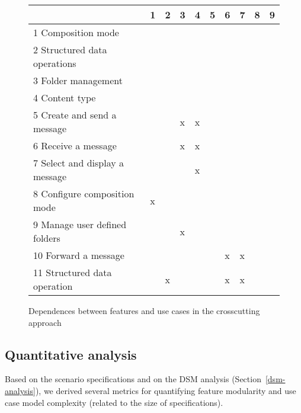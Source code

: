 \documentclass{acm_proc_article-sp}
\begin{document}
\begin{figure}[h]
\centering
\begin{scriptsize}
\begin{tabular}{llllllllll} \hline
								& 1 	& 2 	& 3 & 4 	& 5 	& 6 	& 7 	& 8 	& 9 	 \\ \hline
1 Composition mode 				& 	& 	& 	& 	& 	& 	& 	& 	& 		\\
2 Structured data operations	 		& 	& 	& 	& 	& 	& 	& 	& 	& 	\\
3 Folder management 				& 	& 	& 	& 	& 	& 	& 	& 	& 	\\
4 Content type						& 	& 	& 	& 	& 	& 	& 	& 	& 	\\ \hline
5 Create and send a message 			& 	& 	& x	& x	& 	& 	& 	& 	& 	\\
6 Receive a message 				& 	& 	& x	& x	& 	&	& 	& 	& 	\\
7 Select and display a message 		& 	& 	& 	& x	& 	& 	& 	& 	& 	\\
8 Configure composition mode 		& x	& 	& 	& 	& 	& 	& 	& 	& 	\\
9 Manage user defined folders 		& 	& 	& x	& 	& 	& 	& 	& 	& 	\\ 
10 Forward a message		 		& 	& 	& 	& 	& 	& x	& x	& 	& 	\\ 
11 Structured data operation	 		& 	& x	& 	& 	& 	& x	& x	& 	& 	\\ \hline 
\end{tabular}
\end{scriptsize}
\caption{Dependences between features and use cases in the crosscutting approach}
\label{dsm:ll-cc}
\end{figure}   

\subsection{Quantitative analysis}
\label{quantitative-analysis}

Based on the scenario specifications 
and on the DSM analysis (Section~\ref{dsm-analysis}), we derived several metrics for quantifying 
feature modularity and use case model complexity (related to the size of specifications). 
\end{document}
